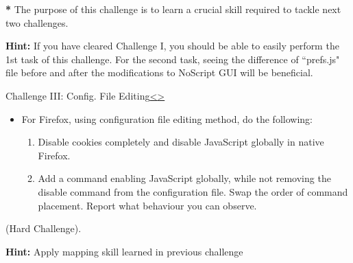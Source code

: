\documentclass[12pt]{extarticle}
\newenvironment{instructionblock}{\Large\bgroup}{\egroup}
\begin{document}
	\vspace{4mm}
	\noindent
	\textbf{*} The purpose of this challenge is to learn a crucial skill required to tackle next two challenges.
	
	\vspace{4mm}
	\noindent
	\textbf{Hint:} If you have cleared Challenge I, you should be able to easily perform the 1st task of this challenge. For the second task, seeing the difference of ``prefs.js" file before and after the modifications to NoScript GUI will be beneficial.	

	
	
	
	\pagebreak
	\begin{slide}{Challenge III: Config. File Editing}{\hyperref[slide 18]{\textless}\hyperref[slide 20]{\textgreater}}
		\begin{instructionblock}
			\begin{itemize}
				\item For Firefox, using configuration file editing method, do the following:
				\begin{enumerate}
					\item Disable cookies completely and disable JavaScript globally in native Firefox.
					\item Add a command enabling JavaScript globally, while not removing the disable command from the configuration file. Swap the order of command placement. Report what behaviour you can observe.
				\end{enumerate}
			\end{itemize}
			(Hard Challenge).
		\end{instructionblock}
	\end{slide}
	
	\vspace{2mm}
	\noindent
	\textbf{Hint:} Apply mapping skill learned in previous challenge



	
	
	
\end{document}
